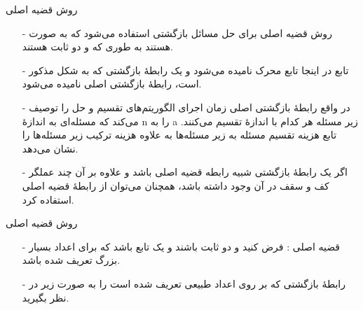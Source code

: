 
\begin{frame}{‌روش قضیه اصلی}
\begin{itemize}\itemr
\item[-]
روش قضیه اصلی
برای حل مسائل بازگشتی استفاده می‌شود که به صورت
هستند به طوری که
و
دو ثابت هستند.
\item[-]
تابع
در اینجا تابع محرک
 نامیده می‌شود و یک رابطهٔ بازگشتی که به شکل مذکور است، رابطهٔ بازگشتی اصلی
  نامیده می‌شود.
\item[-]
در واقع رابطهٔ بازگشتی اصلی زمان اجرای الگوریتم‌های تقسیم و حل را توصیف می‌کند که مسئله‌ای به اندازهٔ n را به a زیر مسئله هر کدام با اندازهٔ
تقسیم می‌کنند. تابع
هزینه تقسیم مسئله به زیر مسئله‌ها به علاوه هزینه ترکیب زیر مسئله‌ها را نشان می‌دهد.
\item[-]
اگر یک رابطهٔ بازگشتی شبیه رابطه قضیه اصلی باشد و علاوه بر آن چند عملگر کف و سقف در آن وجود داشته باشد، همچنان می‌توان از رابطهٔ قضیه اصلی استفاده کرد.
\end{itemize}
\end{frame}


\begin{frame}{‌روش قضیه اصلی}
\begin{itemize}\itemr
\item[-]
قضیه اصلی : فرض کنید
و
دو ثابت باشند و
یک تابع باشد که برای اعداد بسیار بزرگ تعریف شده باشد.
\item[-]
رابطهٔ بازگشتی
که بر روی اعداد طبیعی
تعریف شده است را به صورت زیر در نظر بگیرید.
\begin{center}
\end{center}
\iffalse
به طوری که
\m{aT(n/b)}
برابر است با
\m{a'T( \lfloor n/b \rfloor ) + a"T(\lceil n/b \rceil)}
به ازای ثابت‌های
\m{a' \geqslant 0}
و
\m{a" \geqslant 0}
که در رابطهٔ
\m{a = a' + a"}
صدق می‌کنند.
\fi
\end{itemize}
\end{frame}


